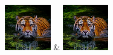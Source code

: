 \begin{table}[h!]
\begin{tabular}
        \includegraphics[width=2cm]{images/processed/tiger/gaussian_5x5_sigma1.0/unblurred_15-iter.png} &
        \includegraphics[width=2cm]{images/processed/tiger/gaussian_5x5_sigma2.0/unblurred_15-iter.png}                                                                                                                                                                                                 \\
    \end{tabular}
\end{table}
